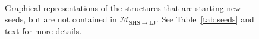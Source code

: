 \begin{figure}
    \centering
    \\
    \caption{Graphical representations of the structures that are starting new
    seeds, but are not contained in $\mathcal{M}_\mathrm{SHS\to LJ}$. See
    Table~\ref{tab:seeds} and text for more details.}
    \label{fig:seeds}
\end{figure}%

